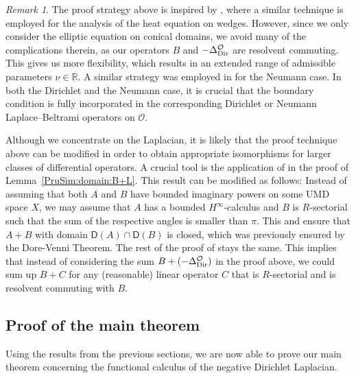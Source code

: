 \documentclass[12pt,a4paper, reqno]{amsart}
\theoremstyle{plain}
\theoremstyle{definition}
\theoremstyle{remark}
\newtheorem{remark}[theorem]{Remark}
\numberwithin{equation}{section}
\newcommand{\1}{\mathbbm{1}}
\newcommand{\R}{\ensuremath{\mathbb{R}}}
\newcommand{\calO}{\ensuremath{\mathcal{O}}}
\newcommand{\sfD}{\ensuremath{\mathsf{D}}}
\newcommand{\Dir}{\textup{Dir}}
\begin{document}
\begin{remark}
The proof strategy above is inspired by \cite[Section~5]{Prss2007HinftycalculusFT}, where a similar technique is employed for the analysis of the heat equation on wedges.
However, since we only consider the elliptic equation on conical domains, we avoid many of the complications therein, as our operators $B$ and $-\Delta_\Dir^\calO$ are resolvent commuting.
This gives us more flexibility, which results in an extended range of admissible parameters $\nu\in\R$. 
A similar strategy was employed in \cite{KoehneSaalWestermann2021,koehne2024optimalregularitystokesequations} for the Neumann case. 
In both the Dirichlet and the Neumann case, it is crucial that the boundary condition is fully incorporated 
in the corresponding Dirichlet or Neumann Laplace--Beltrami operators on $\calO$.

Although we concentrate on the Laplacian, it is likely that the proof technique above can be modified in order to obtain appropriate isomorphisms for larger classes of differential operators.
A crucial tool is the application of \cite[Theorem~8.5]{Prss1993EvolutionaryIE} in the proof of Lemma~\ref{PruSim:domain:B+L}. This result can be modified as follows: Instead of assuming that both $A$ and $B$ have bounded imaginary powers on some UMD space $X$, we may assume that $A$ has a bounded $H^\infty$-calculus and $B$ is $R$-sectorial such that the sum of the respective angles is smaller than $\pi$. This and \cite[Theorem 6.3]{Kalton2001TheH} ensure that $A+B$ with domain $\sfD(A)\cap\sfD(B)$ is closed, which was previously ensured by the Dore-Venni Theorem. The rest of the proof of \cite[Theorem~8.5]{Prss1993EvolutionaryIE} stays the same.
This implies that instead of considering the sum $B+(-\Delta_\Dir^{\calO})$ in the proof above, we could sum up $B+C$ for any (reasonable) linear operator $C$ that is $R$-sectorial and is resolvent commuting with $B$. 
\end{remark}


\subsection{Proof of the main theorem}\label{sec:main:proof}

Using the results from the previous sections, we are now able to prove our main theorem concerning the functional calculus of the negative Dirichlet Laplacian.
\end{document}
